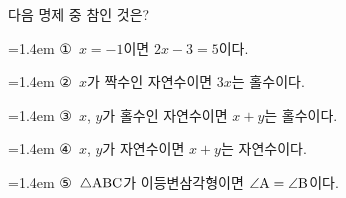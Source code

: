 다음 명제 중 참인 것은?
\par\medskip\par\noindent\hangindent=1.4em {\small ①}\ $x=-1$이면 $2x-3=5$이다.\par\noindent\hangindent=1.4em {\small ②}\ $x$가 짝수인 자연수이면 $3x$는 홀수이다.\par\noindent\hangindent=1.4em {\small ③}\ $x$, $y$가 홀수인 자연수이면 $x+y$는 홀수이다.\par\noindent\hangindent=1.4em {\small ④}\ $x$, $y$가 자연수이면 $x+y$는 자연수이다.\par\noindent\hangindent=1.4em {\small ⑤}\ $\triangle\mathrm{ABC}$가 이등변삼각형이면 $\angle\mathrm{A}=\angle\mathrm{B}$이다.\par\medskip
